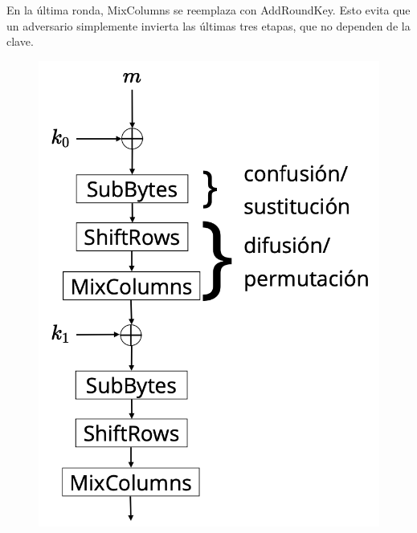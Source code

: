 En la última ronda, MixColumns se reemplaza con AddRoundKey. Esto evita que un adversario simplemente invierta las últimas tres etapas, que no dependen de la clave. \medbreak
\begin{figure}[H]
    \centering
    \includegraphics[scale=0.4]{img/cap4/11.png}

\end{figure}
